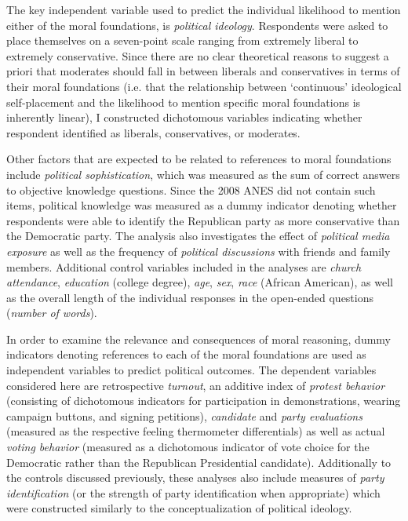 \documentclass[12pt]{article}
\begin{document}
The key independent variable used to predict the individual likelihood to mention either of the moral foundations, is \textit{political ideology}. Respondents were asked to place themselves on a seven-point scale ranging from extremely liberal to extremely conservative. Since there are no clear theoretical reasons to suggest a priori that moderates should fall in between liberals and conservatives in terms of their moral foundations (i.e. that the relationship between `continuous' ideological self-placement and the likelihood to mention specific moral foundations is inherently linear), I constructed dichotomous variables indicating whether respondent identified as liberals, conservatives, or moderates.

Other factors that are expected to be related to references to moral foundations include \textit{political sophistication}, which was measured as the sum of correct answers to objective knowledge questions. Since the 2008 ANES did not contain such items, political knowledge was measured as a dummy indicator denoting whether respondents were able to identify the Republican party as more conservative than the Democratic party. The analysis also investigates the effect of \textit{political media exposure} as well as the frequency of \textit{political discussions} with friends and family members. Additional control variables included in the analyses are \textit{church attendance}, \textit{education} (college degree), \textit{age}, \textit{sex}, \textit{race} (African American), as well as the overall length of the individual responses in the open-ended questions (\textit{number of words}).

In order to examine the relevance and consequences of moral reasoning, dummy indicators denoting references to each of the moral foundations are used as independent variables to predict political outcomes. The dependent variables considered here are retrospective \textit{turnout}, an additive index of \textit{protest behavior} (consisting of dichotomous indicators for participation in demonstrations, wearing campaign buttons, and signing petitions), \textit{candidate} and \textit{party evaluations} (measured as the respective feeling thermometer differentials) as well as actual \textit{voting behavior} (measured as a dichotomous indicator of vote choice for the Democratic rather than the Republican Presidential candidate). Additionally to the controls discussed previously, these analyses also include measures of \textit{party identification} (or the strength of party identification when appropriate) which were constructed similarly to the conceptualization of political ideology.
\end{document}
